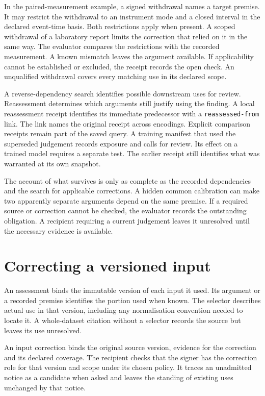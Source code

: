 \documentclass[11pt,a4paper]{article}
\newcommand{\partpage}[1]{\clearpage\section{#1}}
\newcommand{\topic}[1]{\par\smallskip{\sffamily\bfseries\color{ink}#1\par}\nobreak}
\begin{document}
In the paired-measurement example, a signed withdrawal names a target premise. It may restrict the withdrawal to an instrument mode and a closed interval in the declared event-time basis. Both restrictions apply when present. A scoped withdrawal of a laboratory report limits the correction that relied on it in the same way. The evaluator compares the restrictions with the recorded measurement. A known mismatch leaves the argument available. If applicability cannot be established or excluded, the receipt records the open check. An unqualified withdrawal covers every matching use in its declared scope.

A reverse-dependency search identifies possible downstream uses for review. Reassessment determines which arguments still justify using the finding. A local reassessment receipt identifies its immediate predecessor with a \texttt{reassessed-from} link. The link names the original receipt across encodings. Explicit comparison receipts remain part of the saved query. A training manifest that used the superseded judgement records exposure and calls for review. Its effect on a trained model requires a separate test. The earlier receipt still identifies what was warranted at its own snapshot.

\topic{How far the guarantee reaches}
The account of what survives is only as complete as the recorded dependencies and the search for applicable corrections. A hidden common calibration can make two apparently separate arguments depend on the same premise. If a required source or correction cannot be checked, the evaluator records the outstanding obligation. A recipient requiring a current judgement leaves it unresolved until the necessary evidence is available.

\partpage{Correcting a versioned input}\label{sec:inputcorrections}
An assessment binds the immutable version of each input it used. Its argument or a recorded premise identifies the portion used when known. The selector describes actual use in that version, including any normalisation convention needed to locate it. A whole-dataset citation without a selector records the source but leaves its use unresolved.

An input correction binds the original source version, evidence for the correction and its declared coverage. The recipient checks that the signer has the correction role for that version and scope under its chosen policy. It traces an unadmitted notice as a candidate when asked and leaves the standing of existing uses unchanged by that notice.
\end{document}
